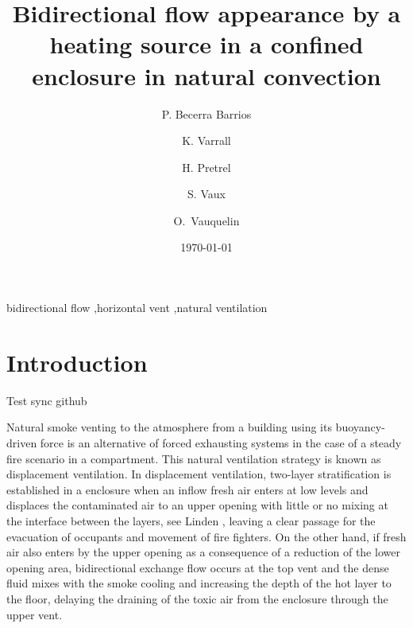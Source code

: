 \documentclass[preprint,12pt]{elsarticle}
\date{\today}
\title{}
\begin{document}
\begin{frontmatter}

\title{Bidirectional flow appearance by a heating source in a confined
  enclosure in natural convection}

\author[label1,label3]{P. Becerra Barrios}

\address[label1]{Laboratoire IUSTI, UMR CNRS 7343, Aix-Marseille Université, \mbox{5 rue Enrico Fermi, 13453 Marseille, France}}
\address[label2]{ \mbox{Institut de Radioprotection et de Sûreté
    Nucléaire (PSN-RES/SA2I)}, \mbox{Centre de Cadarache, 13115 Saint-Paul-Lez-Durance}, France}
\address[label3]{School of Mechanical Engineering, University of Costa Rica, Costa Rica} 

\author[label1]{K. Varrall}

\author[label2]{H. Pretrel}

\author[label2]{S. Vaux}

\author[label1]{\mbox{O. Vauquelin}}

\begin{abstract}


\end{abstract}

\begin{keyword}
bidirectional flow \sep horizontal vent \sep natural ventilation
\end{keyword}

\end{frontmatter}

\linenumbers

\section{Introduction}
\label{sec:org50e52e7}

Test sync github

Natural smoke venting to the atmosphere from a building using its buoyancy-driven force is an alternative of forced exhausting systems in the case of a steady fire scenario in a compartment. This natural ventilation strategy is known as displacement ventilation. In displacement ventilation, two-layer stratification is established in a enclosure when an inflow fresh air enters at low levels and displaces the contaminated air to an upper opening with little or no mixing at the interface between the layers, see Linden \cite{linden_1999}, leaving a clear passage for the evacuation of occupants and movement of fire fighters. On the other hand, if fresh air also enters by the upper opening as a consequence of a reduction of the lower opening area, bidirectional exchange flow occurs at the top vent and the dense fluid mixes with the smoke cooling and increasing the depth of the hot layer to the floor, delaying the draining of the toxic air from the enclosure through the upper vent.
\end{document}
